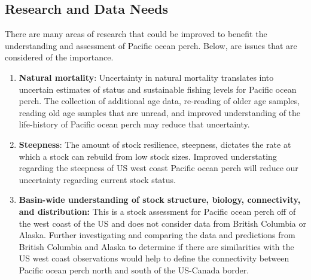 \documentclass[12pt,]{article}
\begin{document}
\subsection*{Research and Data Needs}\label{research-and-data-needs}

There are many areas of research that could be improved to benefit the
understanding and assessment of Pacific ocean perch. Below, are issues
that are considered of the importance.

\begin{enumerate}

\item \textbf{Natural mortality}: Uncertainty in natural mortality translates into uncertain estimates of status and sustainable fishing levels for Pacific ocean perch. The collection of additional age data, re-reading of older age samples, reading old age samples that are unread, and improved understanding of the life-history of Pacific ocean perch may reduce that uncertainty.

\item \textbf{Steepness}: The amount of stock resilience, steepness, dictates the rate at which a stock can rebuild from low stock sizes.  Improved understating regarding the steepness of US west coast Pacific ocean perch will reduce our uncertainty regarding current stock status.

\item \textbf{Basin-wide understanding of stock structure, biology, connectivity, and distribution:} This is a stock assessment for Pacific ocean perch off of the west coast of the US and does not consider data from British Columbia or Alaska. Further investigating and comparing the data and predictions from British Columbia and Alaska to determine if there are similarities with the US west coast observations would help to define the connectivity between Pacific ocean perch north and south of the US-Canada border.

\end{enumerate}
\end{document}
